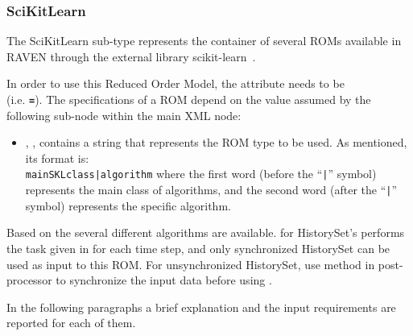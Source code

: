 \subsubsection{SciKitLearn}
\label{subsubsec:SciKitLearn}
The SciKitLearn sub-type represents the container of several ROMs available in
RAVEN through the external library scikit-learn~\cite{SciKitLearn}.
%

In order to use this Reduced Order Model, the  attribute
 needs to be \\  (i.e.
\textbf{\texttt{=}}).
%
The specifications of a  ROM depend on the value assumed
by the following sub-node within the main  XML node:
\begin{itemize}
  \item {}, , contains a string that represents the ROM type to be used.
  As mentioned, its format is:\\
  \texttt{mainSKLclass|algorithm} where the
  first word (before the ``\texttt{|}'' symbol) represents the main class of
  algorithms, and the second word (after the ``\texttt{|}'' symbol) represents
  the specific algorithm.
\end{itemize}
Based on the  several different algorithms are available.
%
\nb for HistorySet's  performs the task given in  for
each time step, and only synchronized HistorySet can be used as input to this ROM. For
unsynchronized HistorySet, use  method in 
post-processor to synchronize the input data before using .

In the following paragraphs a brief explanation and the input requirements are
reported for each of them.
%
